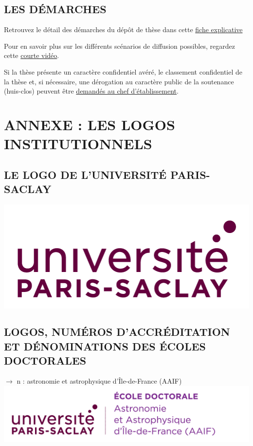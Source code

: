 \documentclass[french,12pt,a4paper]{book}
\begin{document}
\section{LES DÉMARCHES}
Retrouvez le détail des démarches du dépôt de thèse dans cette \href{https://www.universite-paris-saclay.fr/sites/default/files/media/2020-12/fiche_depot_2020_4.pdf}{fiche explicative}\\ \par
Pour en savoir plus sur les différents scénarios de diffusion possibles, regardez cette \href{https://www.youtube.com/watch?v=OK1MFjON5f4}{courte vidéo}.\\ \par
Si la thèse présente un caractère confidentiel avéré, le classement confidentiel de la thèse et, si nécessaire, une dérogation au caractère public de la soutenance (huis-clos) peuvent être \href{https://www.universite-paris-saclay.fr/research/doctorate/quality-assurance-documents/documents-de-reference-relatifs-la-soutenance-de-la-these}{demandés au chef d’établissement}.


\chapter{ANNEXE : LES LOGOS INSTITUTIONNELS}
\section{LE LOGO DE L’UNIVERSITÉ PARIS-SACLAY}
\noindent \includegraphics[scale=0.4]{Logo_ups}
\section{LOGOS, NUMÉROS D’ACCRÉDITATION ET DÉNOMINATIONS DES ÉCOLES DOCTORALES}

\noindent \textbf{\color{Prune}$\rightarrow$} n : astronomie et astrophysique d'Île-de-France (AAIF) \\
\includegraphics[scale=.7]{logo_usp_AAIF}\\
\end{document}
